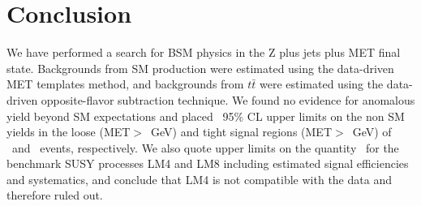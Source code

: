 \section{Conclusion}
\label{sec:conclusion}

We have performed a search for BSM physics in the Z plus jets plus MET final state.
Backgrounds from SM \Z production were estimated using the data-driven
MET templates method, and backgrounds from $t\bar{t}$ were estimated using
the data-driven opposite-flavor subtraction technique. We found no evidence
for anomalous yield beyond SM expectations and placed \statistics\ 95\% CL upper limits
on the non SM yields in the loose (MET$>$\signalmetl~GeV) and tight signal regions (MET$>$\signalmett~GeV)
of \ulloose~and \ultight~events, respectively. 
We also quote upper limits on the quantity
\sta\ for the
benchmark SUSY processes LM4 and LM8
including estimated signal efficiencies and systematics, 
and conclude that LM4 is not compatible with the data and therefore ruled out.
